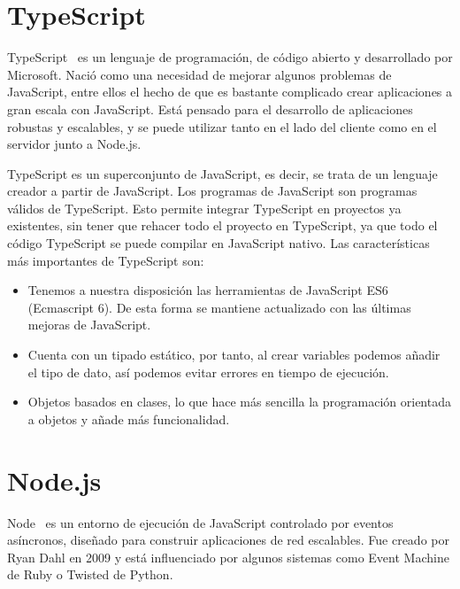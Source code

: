 \documentclass[a4paper, 12pt]{book}
\begin{document}
\section{TypeScript} 
\label{sec:typescript}

TypeScript~\cite{typescript} es un lenguaje de programación, de código abierto y desarrollado por Microsoft.
Nació como una necesidad de mejorar algunos problemas de JavaScript, entre ellos el hecho de que es bastante complicado crear aplicaciones a gran escala con JavaScript. Está pensado para el desarrollo de aplicaciones robustas y escalables, y se puede utilizar tanto en el lado del cliente como en el servidor junto a Node.js.

TypeScript es un superconjunto de JavaScript, es decir, se trata de un lenguaje creador a partir de JavaScript. Los programas de JavaScript son programas válidos de TypeScript. Esto permite integrar TypeScript en proyectos ya existentes, sin tener que rehacer todo el proyecto en TypeScript, ya que todo el código TypeScript se puede compilar en JavaScript nativo.
Las características más importantes de TypeScript son:

\begin{itemize}

	\item Tenemos a nuestra disposición las herramientas de JavaScript ES6 (Ecmascript 6). De esta forma se mantiene actualizado con las últimas mejoras de JavaScript.

	\item Cuenta con un tipado estático, por tanto, al crear variables podemos añadir el tipo de dato, así podemos evitar errores en tiempo de ejecución.

	\item Objetos basados en clases, lo que hace más sencilla la programación orientada a objetos y añade más funcionalidad.

\end{itemize}

\section{Node.js} 
\label{sec:nodejs}

Node~\cite{nodejs} es un entorno de ejecución de JavaScript controlado por eventos asíncronos, diseñado para construir aplicaciones de red escalables.
Fue creado por Ryan Dahl en 2009 y está influenciado por algunos sistemas como Event Machine de Ruby o Twisted de Python.
\end{document}
